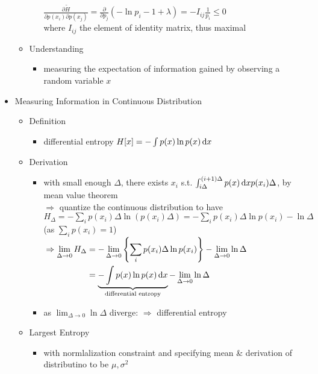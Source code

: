 \begin{itemize}
\begin{itemize}
\begin{itemize}
		$\frac{\partial \tilde H}{\partial p(x_i) \partial p(x_j)} = \frac{\partial}{\partial p_j} (-\ln p_i -1+\lambda) = -I_{ij}\frac{1}{p_i} \le 0$ \\
		where $I_{ij}$ the element of identity matrix, thus maximal
		\end{itemize}
	\item Understanding
		\begin{itemize}
		\item measuring the expectation of information gained by observing a random variable $x$
		\end{itemize}
	\end{itemize}

\item Measuring Information in Continuous Distribution
	\begin{itemize}
	\item Definition
		\begin{itemize}
		\item differential entropy $H[x] = -\int p(x)\ln p(x)\mathop{}\!\mathrm{d} x$
		\end{itemize}
	\item Derivation
		\begin{itemize}
		\item with small enough $\Delta$, there exists $x_i$ s.t. $\int_{i\Delta}^{(i+1)\Delta}p(x)\mathop{}\!\mathrm{d} x p(x_i)\Delta$, by mean value theorem \\
		$\Rightarrow$ quantize the continuous distribution to have $H_\Delta = -\sum_ip(x_i)\Delta \ln (p(x_i) \Delta) = -\sum_i p(x_i)\Delta \ln p(x_i) - \ln \Delta$ \\
		(as $\sum_i p(x_i)=1$) \\
		$\begin{alignedat}{2} & \Rightarrow \lim_{\Delta\rightarrow0}H_\Delta &&= -\lim_{\Delta\rightarrow0} \left\{ \sum_i p(x_i)\Delta\ln p(x_i) \right\} - \lim_{\Delta\rightarrow0} \ln\Delta \\
		& &&= \underbrace{-\int p(x)\ln p(x)\mathop{}\!\mathrm{d} x}_\text{differential entropy} - \lim_{\Delta\rightarrow0} \ln\Delta \end{alignedat}$
		\item as $\lim_{\Delta\rightarrow0} \ln\Delta$ diverge: $\Rightarrow$ differential entropy 
		\end{itemize}
	\item Largest Entropy
		\begin{itemize}
		\item with normlalization constraint and specifying mean \& derivation of distributino to be $\mu,\sigma^2$ \\

\end{itemize}
\end{itemize}
\end{itemize}
